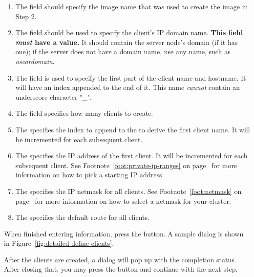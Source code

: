 \begin{enumerate}
  
\item The  field should specify the image name that
  was used to create the image in Step 2.
  
\item The  field should be used to specify the
  client's IP domain name.  {\bf This field \emph{must} have a value.}
  It should contain the server node's domain (if it has one); if the
  server does not have a domain name, use any name, such as
  \emph{oscardomain}.

\item The  field is used to specify the first part of
  the client name and hostname. It will have an index appended to the
  end of it. This name \emph{cannot} contain an underscore 
  character "\_".

\item The  field specifies how many clients to
  create.
  
\item The  specifies the index to append to the
   to derive the first client name. It will be
  incremented for each subsequent client.

\item The  specifies the IP address of the first
  client. It will be incremented for each subsequent client.  See
  Footnote~\ref{foot:private-ip-ranges} on
  page~\pageref{foot:private-ip-ranges} for more information on how to
  pick a starting IP address.
  
\item The  specifies the IP netmask for all
  clients.  See Footnote~\ref{foot:netmask} on
  page~\pageref{foot:netmask} for more information on how to select a
  netmask for your cluster.
  
\item The  specifies the default route for all
  clients.

\end{enumerate}
  
When finished entering information, press the  button.
A sample dialog is shown in Figure~\ref{fig:detailed-define-clients}. 

After the clients are created, a dialog will pop up with the
completion status. After closing that, you may press the
 button and continue with the next step.

